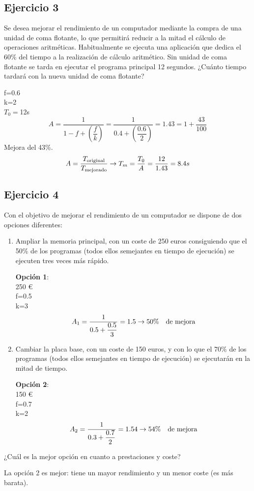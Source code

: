 \subsection{Ejercicio 3}
\noindent
Se desea mejorar el rendimiento de un computador mediante la compra de una unidad de coma flotante, lo que permitirá reducir a la mitad el cálculo de operaciones aritméticas. Habitualmente se ejecuta una aplicación que dedica el 60\% del tiempo a la realización de cálculo aritmético. Sin unidad de coma flotante se tarda en ejecutar el programa principal 12 segundos. ¿Cuánto tiempo tardará con la nueva unidad de coma flotante?
\begin{tcolorbox}[colback=white,colframe=cyan!50!black,fonttitle=\bfseries]
f=0.6\\
k=2\\
$T_0=$12s
\[
A=\dfrac{1}{1-f+\left(\dfrac{f}{k}\right)}=\dfrac{1}{0.4+\left(\dfrac{0.6}{2}\right)}=1.43=1+\dfrac{43}{100}
\]
Mejora del 43\%.
\[
A=\dfrac{T_{\text{original}}}{T_{\text{mejorado}}}\rightarrow T_m=\dfrac{T_0}{A}=\dfrac{12}{1.43}=8.4s
\]
\end{tcolorbox}
\subsection{Ejercicio 4}
\noindent
Con el objetivo de mejorar el rendimiento de un computador se dispone de dos opciones diferentes:
\begin{enumerate}
    \item Ampliar la memoria principal, con un coste de 250 euros consiguiendo que el 50\% de los programas (todos ellos semejantes en tiempo de ejecución) se ejecuten tres veces más rápido.
\begin{tcolorbox}[colback=white,colframe=cyan!50!black,fonttitle=\bfseries]
\textbf{Opción 1}:\\
250 \textup{\euro}\\
f=0.5\\
k=3
\[
A_1=\dfrac{1}{0.5+\dfrac{0.5}{3}}=1.5\rightarrow 50\%\quad\text{de mejora}
\]
\end{tcolorbox}    
    \item Cambiar la placa base, con un coste de 150 euros, y con lo que el 70\% de los programas (todos ellos semejantes en tiempo de ejecución) se ejecutarán en la mitad de tiempo.
\begin{tcolorbox}[colback=white,colframe=cyan!50!black,fonttitle=\bfseries]
\textbf{Opción 2}:\\
150 \textup{\euro}\\
f=0.7\\
k=2
\[
A_2=\dfrac{1}{0.3+\dfrac{0.7}{2}}=1.54\rightarrow 54\%\quad\text{de mejora}
\]
\end{tcolorbox}    
\end{enumerate}
¿Cuál es la mejor opción en cuanto a prestaciones y coste?
\begin{tcolorbox}[colback=white,colframe=cyan!50!black,fonttitle=\bfseries]
La opción 2 es mejor: tiene un mayor rendimiento y un menor coste (es más barata).
\end{tcolorbox} 
